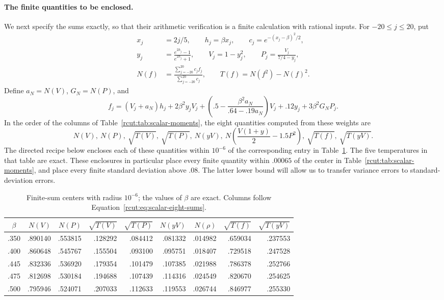 \paragraph{The finite quantities to be enclosed.}
We next specify the sums exactly, so that their arithmetic verification
is a finite calculation with rational inputs. For \(-20\leq j\leq20\), put
\begin{equation}
 \begin{split}
 x_j&=2j/5,\qquad h_j=\beta x_j,
 \qquad c_j=e^{-(x_j-\beta)^2/2},\\
 y_j&=\frac{e^{2h_j}-1}{e^{2h_j}+1},\qquad
 V_j=1-y_j^2,\qquad P_j=\frac{V_j}{7/4-y_j},\\
 N(f)&=\frac{\sum_{j=-20}^{20}c_j f_j}{\sum_{j=-20}^{20}c_j},
 \qquad T(f)=N(f^2)-N(f)^2.
 \end{split}
 \label{rcut:eq:scalar-finite-sums}
\end{equation}
Define \(a_N=N(V)\), \(G_N=N(P)\), and
\[
 f_j=(V_j+a_N)h_j+2\beta^2y_jV_j+
       \left(.5-\frac{\beta^2a_N}{.64-.19a_N}\right)V_j
       +.12y_j+3\beta^2G_NP_j.
\]
In the order of the columns of Table~\ref{rcut:tab:scalar-moments},
the eight quantities computed from these weights are
\begin{equation}
 N(V),\ N(P),\ \sqrt{T(V)},\ \sqrt{T(P)},\ N(yV),\
 N\!\left(\frac{V(1+y)}2-1.5P^2\right),\ \sqrt{T(f)},\
 \sqrt{T(yV)}.
 \label{rcut:eq:scalar-eight-sums}
\end{equation}
The directed recipe below encloses each of these quantities within
\(10^{-6}\) of the corresponding entry in
Table~\ref{rcut:tab:scalar-finite-values}. The five temperatures in that
table are exact. These enclosures in particular place every finite
quantity within \(.00065\) of the center in
Table~\ref{rcut:tab:scalar-moments}, and place every finite standard
deviation above \(.08\). The latter lower bound will allow us to
transfer variance errors to standard-deviation errors.

\begin{table}[hbp]
 \centering\small
 \caption{Finite-sum centers with radius \(10^{-6}\); the values of
 \(\beta\) are exact. Columns follow
 Equation~\eqref{rcut:eq:scalar-eight-sums}.}
 \label{rcut:tab:scalar-finite-values}
 \setlength{\tabcolsep}{3pt}
 \begin{tabular}{crrrrrrrr}
 \toprule
 \(\beta\)&\(N(V)\)&\(N(P)\)&\(\sqrt{T(V)}\)&\(\sqrt{T(P)}\)&
 \(N(yV)\)&\(N(\rho)\)&\(\sqrt{T(f)}\)&\(\sqrt{T(yV)}\)\\
 \midrule
 .350&.890140&.553815&.128292&.084412&.081332&.014982&.659034&.237553\\
 .400&.860648&.545767&.155504&.093100&.095751&.018407&.729518&.247528\\
 .445&.832336&.536920&.179354&.101479&.107385&.021988&.786378&.252766\\
 .475&.812698&.530184&.194688&.107439&.114316&.024549&.820670&.254625\\
 .500&.795946&.524071&.207033&.112633&.119553&.026744&.846977&.255330\\
 \bottomrule
 \end{tabular}
\end{table}

